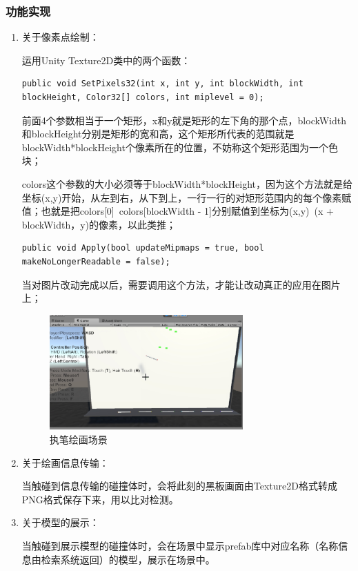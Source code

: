 \documentclass{article}
\begin{document}
\subsubsection{功能实现}
\begin{enumerate}
   
    \item 关于像素点绘制： 
    
    运用Unity Texture2D类中的两个函数：
    
\begin{lstlisting}[title=SetPixel, frame=shadowbox]
public void SetPixels32(int x, int y, int blockWidth, int blockHeight, Color32[] colors, int miplevel = 0);
\end{lstlisting}
    
    \qquad 前面4个参数相当于一个矩形，x和y就是矩形的左下角的那个点，blockWidth和blockHeight分别是矩形的宽和高，这个矩形所代表的范围就是blockWidth*blockHeight个像素所在的位置，不妨称这个矩形范围为一个色块；
    
    \qquad colors这个参数的大小必须等于blockWidth*blockHeight，因为这个方法就是给坐标(x,y)开始，从左到右，从下到上，一行一行的对矩形范围内的每个像素赋值；也就是把colors[0]~colors[blockWidth - 1]分别赋值到坐标为(x,y)~(x + blockWidth，y)的像素，以此类推；
    
    \begin{lstlisting}[title=Apply, frame=shadowbox]
public void Apply(bool updateMipmaps = true, bool makeNoLongerReadable = false);
\end{lstlisting}
     
     \qquad 当对图片改动完成以后，需要调用这个方法，才能让改动真正的应用在图片上；
    
    \begin{figure}[htb]
        \centering
        \includegraphics[width=0.7\textwidth]{images/draw.jpg}
        \caption{执笔绘画场景}\label{fig:digit}
    \end{figure} 
    
     
    \item 关于绘画信息传输：
    
    \qquad 当触碰到信息传输的碰撞体时，会将此刻的黑板画面由Texture2D格式转成PNG格式保存下来，用以比对检测。
    
    
    \item 关于模型的展示：
    
    \qquad 当触碰到展示模型的碰撞体时，会在场景中显示prefab库中对应名称（名称信息由检索系统返回）的模型，展示在场景中。
    
\end{enumerate}
\end{document}
